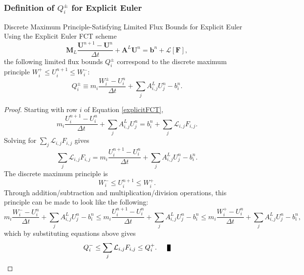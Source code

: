 \subsubsection{Definition of $Q_i^\pm$ for Explicit Euler}
\begin{theorem}{Discrete Maximum Principle-Satisfying Limited Flux Bounds for
  Explicit Euler}
   Using the Explicit Euler FCT scheme
   \begin{equation}\label{explicitFCT}
      \mathbf{M}_L\frac{\mathbf{U}^{n+1}-\mathbf{U}^n}{\Delta t}
         + \mathbf{A}^L\mathbf{U}^n
         = \mathbf{b}^n + \mathcal{L}[\mathbf{F}],
   \end{equation}
   the following limited flux bounds $Q_i^\pm$ correspond to the discrete
   maximum principle $W_i^+\le U_i^{n+1}\le W_i^-$:
   \begin{equation}\label{Q_ex}
      Q_i^\pm \equiv m_i\frac{W_i^\pm-U_i^n}{\Delta t}
      + \sum\limits_j A_{i,j}^L U_j^n - b_i^n.
   \end{equation}
\end{theorem}

\begin{proof}
   Starting with row $i$ of Equation \eqref{explicitFCT},
   \[
      m_i\frac{U_i^{n+1}-U_i^n}{\Delta t}
      + \sum\limits_j A_{i,j}^L U_j^n
      = b_i^n + \sum\limits_j\mathcal{L}_{i,j}F_{i,j}.
   \]
   Solving for $\sum\limits_j\mathcal{L}_{i,j}F_{i,j}$ gives
   \[
      \sum\limits_j\mathcal{L}_{i,j}F_{i,j} =
      m_i\frac{U_i^{n+1}-U_i^n}{\Delta t}
      + \sum\limits_j A_{i,j}^L U_j^n
      - b_i^n.
   \]
   The discrete maximum principle is
   \[
      W_i^-\le U_i^{n+1}\le W_i^+.
   \]
   Through addition/subtraction and multiplication/division operations, this
   principle can be made to look like the following:
   \[
   m_i\frac{W_i^- -U_i^n}{\Delta t}
      + \sum\limits_j A_{i,j}^L U_j^n
      - b_i^n
   \le m_i\frac{U_i^{n+1}-U_i^n}{\Delta t}
      + \sum\limits_j A_{i,j}^L U_j^n
      - b_i^n
   \le m_i\frac{W_i^+ -U_i^n}{\Delta t}
      + \sum\limits_j A_{i,j}^L U_j^n
      - b_i^n,
   \]
   which by substituting equations above gives
   \[
      Q_i^-\le\sum\limits_j \mathcal{L}_{i,j}F_{i,j}\le Q_i^+.\qed
   \]
\end{proof}